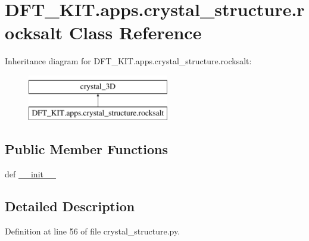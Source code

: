 \hypertarget{class_d_f_t___k_i_t_1_1apps_1_1crystal__structure_1_1rocksalt}{\section{D\+F\+T\+\_\+\+K\+I\+T.\+apps.\+crystal\+\_\+structure.\+rocksalt Class Reference}
\label{class_d_f_t___k_i_t_1_1apps_1_1crystal__structure_1_1rocksalt}
}
Inheritance diagram for D\+F\+T\+\_\+\+K\+I\+T.\+apps.\+crystal\+\_\+structure.\+rocksalt\+:\begin{figure}[H]
\begin{center}
\leavevmode
\includegraphics[height=2.000000cm]{class_d_f_t___k_i_t_1_1apps_1_1crystal__structure_1_1rocksalt}
\end{center}
\end{figure}
\subsection*{Public Member Functions}
\begin{DoxyCompactItemize}
\item 
def \hyperlink{class_d_f_t___k_i_t_1_1apps_1_1crystal__structure_1_1rocksalt_aa61780261289f4e7bc5667cf9079770b}{\+\_\+\+\_\+init\+\_\+\+\_\+}
\end{DoxyCompactItemize}


\subsection{Detailed Description}


Definition at line 56 of file crystal\+\_\+structure.\+py.



